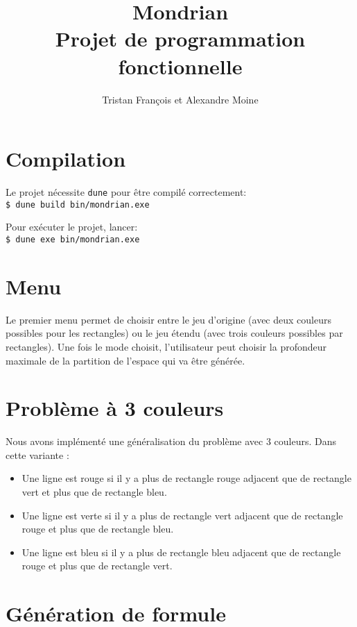 \documentclass[10pt,a4paper]{article}
\begin{document}
	\title{Mondrian \\
			\large Projet de programmation fonctionnelle}
	
	\author{Tristan François et Alexandre Moine}
	\maketitle
	
\section{Compilation}
Le projet nécessite \verb|dune| pour être compilé correctement:\\
\verb|$ dune build bin/mondrian.exe|

Pour exécuter le projet, lancer:\\
\verb|$ dune exe bin/mondrian.exe|

\section{Menu}
Le premier menu permet de choisir entre le jeu d'origine (avec deux couleurs possibles pour les rectangles) ou le jeu étendu (avec trois couleurs possibles par rectangles).
Une fois le mode choisit, l'utilisateur peut choisir la profondeur maximale de la partition de l'espace qui va être générée.

\section{Problème à 3 couleurs}

Nous avons implémenté une généralisation du problème avec 3 couleurs. Dans cette variante :
\begin{itemize}
	\item Une ligne est rouge si il y a plus de rectangle rouge adjacent que de rectangle vert et plus que de rectangle bleu.
	\item Une ligne est verte si il y a plus de rectangle vert adjacent que de rectangle rouge et plus que de rectangle bleu.
	\item Une ligne est bleu si il y a plus de rectangle bleu adjacent que de rectangle rouge et plus que de rectangle vert.
\end{itemize}
	
\section{Génération de formule}
\end{document}
